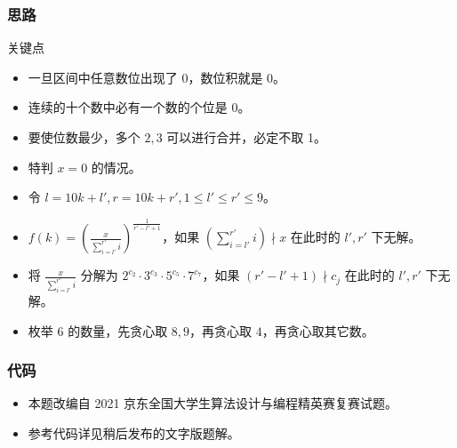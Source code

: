 \documentclass[
     aspectratio=169,                   %
]{beamer}
\begin{document}
\begin{frame}
	\frametitle{思路}
	 
	\begin{exampleblock}{关键点}
		\begin{itemize}
			\item 一旦区间中任意数位出现了 0，数位积就是 0。
			\item 连续的十个数中必有一个数的个位是 0。
			\item 要使位数最少，多个 $2,3$ 可以进行合并，必定不取 1。
		\end{itemize}
	\end{exampleblock}
	\begin{itemize}
		\item 特判 $x=0$ 的情况。
		\item 令 $l=10k+l',r=10k+r',1 \leq l' \leq r' \leq 9$。
		\item $f(k)=(\frac{x}{\sum_{i=l'}^{r'}i})^{\frac{1}{r'-l'+1}}$，如果 $(\sum_{i=l'}^{r'}i) \nmid x$ 在此时的 $l',r'$ 下无解。
		\item 将 $\frac{x}{\sum_{i=l'}^{r'}i}$ 分解为 $2^{c_2}\cdot 3^{c_3}\cdot 5^{c_5}\cdot 7^{c_7}$，如果 $(r'-l'+1) \nmid c_j$ 在此时的 $l',r'$ 下无解。
		\item 枚举 $6$ 的数量，先贪心取 $8,9$，再贪心取 $4$，再贪心取其它数。
	\end{itemize}
	
	
\end{frame}

\begin{frame}[fragile]
	\frametitle{代码}
	\begin{itemize}
	\item 本题改编自 2021 京东全国大学生算法设计与编程精英赛复赛试题。
	\item 参考代码详见稍后发布的文字版题解。
	\end{itemize}
\end{frame}


\makebottom     %
\end{document}
